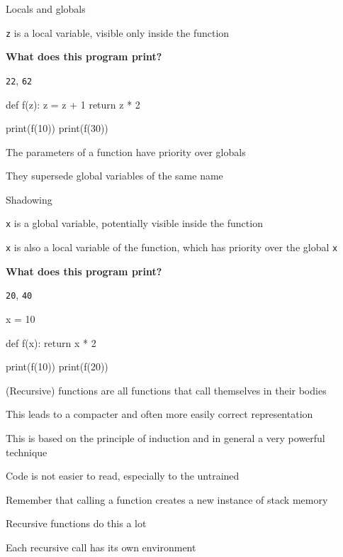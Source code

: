 \documentclass{beamer}
\begin{document}
\begin{frame}[fragile]{Locals and globals}
\begin{codewithblock}{\item \texttt{z} is a local variable, visible only inside the function \pause \item \textbf{What does this program print?} \pause \item \texttt{22}, \texttt{62}}
def f(z):
  z = z + 1
  return z * 2

print(f(10))
print(f(30))
\end{codewithblock}
\end{frame}

\begin{slide}{
\item The parameters of a function have priority over globals
\item They supersede global variables of the same name
}\end{slide}

\begin{frame}[fragile]{Shadowing}
\begin{codewithblock}{\item \texttt{x} is a global variable, potentially visible inside the function \item \texttt{x} is also a local variable of the function, which has priority over the global \texttt{x} \pause \item \textbf{What does this program print?} \pause \item \texttt{20}, \texttt{40}}
x = 10

def f(x):
  return x * 2

print(f(10))
print(f(20))
\end{codewithblock}
\end{frame}

\begin{slide}{
\item (Recursive) functions are all functions that call themselves in their bodies
\item This leads to a compacter and often more easily correct representation
\item This is based on the principle of induction and in general a very powerful technique
\item Code is not easier to read, especially to the untrained
}\end{slide}

\begin{slide}{
\item Remember that calling a function creates a new instance of stack memory
\item Recursive functions do this a lot
\item Each recursive call has its own environment
}\end{slide}
\end{document}
